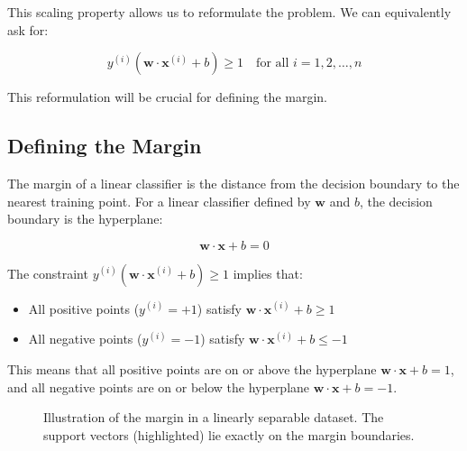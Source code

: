 \documentclass{article}
\begin{document}
This scaling property allows us to reformulate the problem. We can equivalently ask for:

\[
y^{(i)}(\mathbf{w} \cdot \mathbf{x}^{(i)} + b) \geq 1 \quad \text{for all } i = 1, 2, \ldots, n
\]

This reformulation will be crucial for defining the margin.

\subsection{Defining the Margin}
The margin of a linear classifier is the distance from the decision boundary to the nearest training point. For a linear classifier defined by $\mathbf{w}$ and $b$, the decision boundary is the hyperplane:

\[
\mathbf{w} \cdot \mathbf{x} + b = 0
\]

The constraint $y^{(i)}(\mathbf{w} \cdot \mathbf{x}^{(i)} + b) \geq 1$ implies that:
\begin{itemize}
    \item All positive points ($y^{(i)} = +1$) satisfy $\mathbf{w} \cdot \mathbf{x}^{(i)} + b \geq 1$
    \item All negative points ($y^{(i)} = -1$) satisfy $\mathbf{w} \cdot \mathbf{x}^{(i)} + b \leq -1$
\end{itemize}

This means that all positive points are on or above the hyperplane $\mathbf{w} \cdot \mathbf{x} + b = 1$, and all negative points are on or below the hyperplane $\mathbf{w} \cdot \mathbf{x} + b = -1$.

\begin{figure}[h]
\centering
{}
\caption{Illustration of the margin in a linearly separable dataset. The support vectors (highlighted) lie exactly on the margin boundaries.}
\end{figure}
\end{document}
